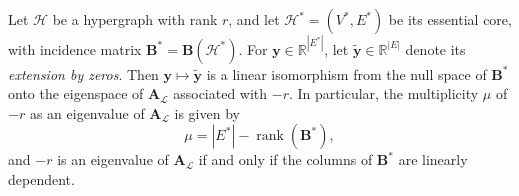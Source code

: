 \documentclass[12pt,reqno]{amsart}
\begin{document}
\begin{theorem}\label{teo:multiplicity}
Let $\mathcal{H}$ be a hypergraph with rank $r$, and let $\mathcal{H}^* = (V^*, E^*)$ be its essential core, with incidence matrix $\mathbf{B}^* = \mathbf{B}(\mathcal{H}^*)$. For $\mathbf{y} \in \mathbb{R}^{|E^*|}$, let $\widetilde{\mathbf{y}} \in \mathbb{R}^{|E|}$ denote its \textit{extension by zeros}. Then $\mathbf{y} \mapsto \widetilde{\mathbf{y}}$ is a linear isomorphism from the null space of $\mathbf{B}^*$ onto the eigenspace of $\mathbf{A}_{\mathcal{L}}$ associated with $-r$. In particular, the multiplicity $\mu$ of $-r$ as an eigenvalue of $\mathbf{A}_{\mathcal{L}}$ is given by
\begin{equation*}
\mu = |E^*| - \operatorname{rank}(\mathbf{B}^*),
\end{equation*}
and $-r$ is an eigenvalue of $\mathbf{A}_{\mathcal{L}}$ if and only if the columns of $\mathbf{B}^*$ are linearly dependent.
\end{theorem}
\end{document}
